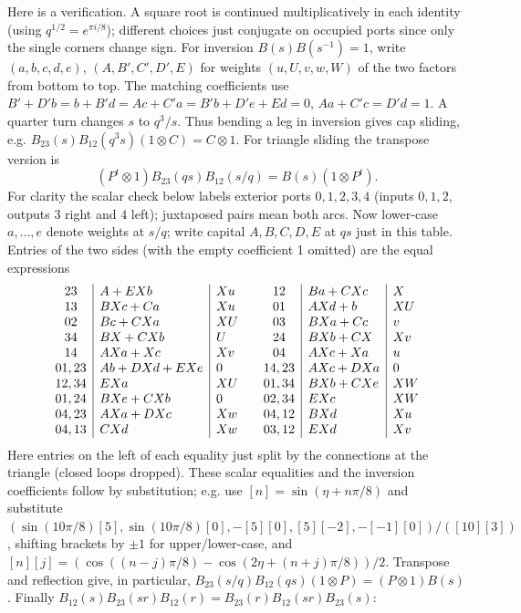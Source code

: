 Here is a verification. A square root is continued multiplicatively in each identity (using \(q^{1/2}=e^{\pi i/8}\)); different choices just conjugate on occupied ports since only the single corners change sign. For inversion \(B(s)B(s^{-1})=1\), write \((a,b,c,d,e)\), \((A,B',C',D',E)\) for weights \((u,U,v,w,W)\) of the two factors from bottom to top. The matching coefficients use
\(B'+D'b=b+B'd=A c+C'a=B'b+D'e+E d=0\), \(A a+C'c=D'd=1\).
A quarter turn changes \(s\) to \(q^3/s\). Thus bending a leg in inversion gives cap sliding, e.g. \(B_{23}(s)B_{12}(q^3s)(1\otimes C)=C\otimes1\).
For triangle sliding the transpose version is
\[
 (P^t\otimes1)B_{23}(qs) B_{12}(s/q)=B(s)(1\otimes P^t).
\]
For clarity the scalar check below labels exterior ports \(0,1,2,3,4\) (inputs \(0,1,2\), outputs \(3\) right and \(4\) left); juxtaposed pairs mean both arcs. Now lower-case \(a,\ldots,e\) denote weights at \(s/q\); write capital \(A,B,C,D,E\) at \(qs\) just in this table. Entries of the two sides (with the empty coefficient 1 omitted) are the equal expressions
\[
\begin{array}{c|l|l@{\qquad}c|l|l}
23&A+EXb&Xu&12&Ba+C Xc&X\\
13&B Xc+C a&Xu&01&A Xd+b&XU\\
02&B c+C Xa&XU&03&B Xa+C c&v\\
34&B X+C Xb&U&24&B Xb+C X&Xv\\
14&A Xa+X c&Xv&04&A Xc+X a&u\\
01,23&A b+D Xd+E Xe&0&14,23&A Xc+D Xa&0\\
12,34&E Xa&XU&01,34&B Xb+C Xe&XW\\
01,24&B Xe+C Xb&0&02,34&E Xc&XW\\
04,23&A Xa+D Xc&Xw&04,12&B Xd&Xu\\
04,13&C Xd&Xw&03,12&E Xd&Xv
\end{array}
\]
Here entries on the left of each equality just split by the connections at the triangle (closed loops dropped). These scalar equalities and the inversion coefficients follow by substitution; e.g. use \([n]=\sin(\eta+n\pi/8)\) and substitute
\((\sin(10\pi/8)[5],\sin(10\pi/8)[0],-[5][0],[5][-2],-[-1][0])/([10][3])\), shifting brackets by \(\pm1\) for upper/lower-case, and \([n][j]=(\cos((n-j)\pi/8)-\cos(2\eta+(n+j)\pi/8))/2\).
Transpose and reflection give, in particular, \(B_{23}(s/q)B_{12}(qs)(1\otimes P)=(P\otimes1)B(s)\). Finally
\(B_{12}(s)B_{23}(sr)B_{12}(r)=B_{23}(r)B_{12}(sr)B_{23}(s)\):
